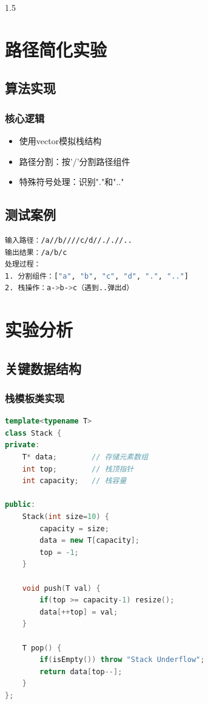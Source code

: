 \documentclass[a4paper,12pt]{report}
\begin{document}
\begin{spacing}{1.5}
\chapter{路径简化实验}
\section{算法实现}
\subsection{核心逻辑}
\begin{itemize}
    \item 使用vector模拟栈结构
    \item 路径分割：按'/'分割路径组件
    \item 特殊符号处理：识别"."和".."
\end{itemize}

\section{测试案例}
\begin{lstlisting}[language=bash]
输入路径：/a//b////c/d//././/..
输出结果：/a/b/c
处理过程：
1. 分割组件：["a", "b", "c", "d", ".", ".."]
2. 栈操作：a->b->c（遇到..弹出d）
\end{lstlisting}

\chapter{实验分析}
\section{关键数据结构}
\subsection{栈模板类实现}
\begin{lstlisting}[language=C++]
template<typename T>
class Stack {
private:
    T* data;        // 存储元素数组
    int top;        // 栈顶指针
    int capacity;   // 栈容量
    
public:
    Stack(int size=10) {
        capacity = size;
        data = new T[capacity];
        top = -1;
    }
    
    void push(T val) {
        if(top >= capacity-1) resize();
        data[++top] = val;
    }
    
    T pop() {
        if(isEmpty()) throw "Stack Underflow";
        return data[top--];
    }
};
\end{lstlisting}


\end{spacing}
\end{document}
